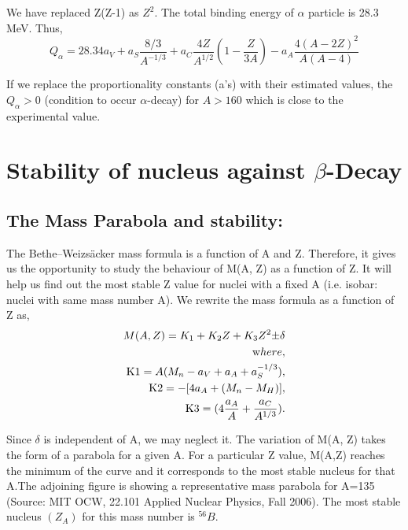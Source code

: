  
\par We have replaced Z(Z-1) as $Z^2$.  The total binding energy of $\alpha$ particle is 28.3 MeV. Thus,
  \begin{equation}
  Q_\alpha=28.34a_V+a_S\frac{8/3}{A^{-1/3}}+a_C\frac{4Z}{A^{1/2}}(1-\frac{Z}{3A})-a_A\frac{4(A-2Z)^2}{A(A-4)}
  \end{equation}

If we replace the proportionality constants (a’s) with their estimated values, the $Q_\alpha>0$  (condition to occur $\alpha$-decay) for $A>160$ which is close to the experimental value.


   
\pagebreak\section{{Stability of nucleus against $\beta$-Decay}}
 
\subsection{The Mass Parabola and stability:}
   The Bethe–Weizsäcker mass formula is a function of A and Z. Therefore, it gives us the opportunity to study
the behaviour of M(A, Z) as a function of Z. It will
help us find out the most stable Z value for nuclei
with a fixed A (i.e. isobar: nuclei with same mass
number A). We rewrite the mass formula as a
function of Z as,
\begin{equation}
\begin{split}
     M(A, Z)=K_1+K_2Z+K_3Z^2{\pm}\delta
\\ \textrm where,
\\\textrm K1=A(M_n-a_V+a_A+a_S^{-1/3}),
 \\\textrm K2=-[4a_A+(M_n-M_H)],
  \\ \textrm K3=(4\frac{a_A}{A}+\frac{a_C}{A^{1/3}}).
\end{split}
\end{equation}
 
\par Since $\delta$ is independent of A, we may neglect it.
The variation of M(A, Z) takes the form of a parabola for a given A. For a particular Z value, M(A,Z) reaches the minimum of the curve and it corresponds to the most stable nucleus for that A.The adjoining figure is showing a representative mass parabola for A=135 (Source: MIT OCW,
22.101 Applied Nuclear Physics, Fall 2006). The most stable nucleus $(Z_A)$  for this mass number is ${}^{56}B $.

